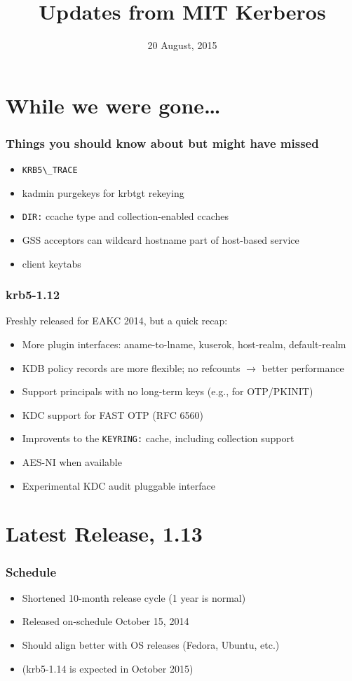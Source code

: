 \documentclass{beamer}
\title{Updates from MIT Kerberos}
\date{20 August, 2015}
\begin{document}
\AtBeginSection[]
{
    \begin{frame}
	\tableofcontents[currentsection]
    \end{frame}
}

\frame{\titlepage}

\section{While we were gone\ldots{}}

\begin{frame}[fragile]
\frametitle{Things you should know about but might have missed}
\begin{itemize}
\item{\verb+KRB5\_TRACE+}
\item{kadmin purgekeys for krbtgt rekeying}
\item{\verb+DIR:+ ccache type and collection-enabled ccaches}
\item{GSS acceptors can wildcard hostname part of host-based service}
\item{client keytabs}
\end{itemize}
\end{frame}

\begin{frame}[fragile]
\frametitle{krb5-1.12}
Freshly released for EAKC 2014, but a quick recap:
\begin{itemize}
\item{More plugin interfaces: aname-to-lname, kuserok, host-realm,
	default-realm}
\item{KDB policy records are more flexible; no refcounts $\rightarrow$
	better performance}
\item{Support principals with no long-term keys (e.g., for OTP/PKINIT)}
\item{KDC support for FAST OTP (RFC 6560)}
\item{Improvents to the \verb+KEYRING:+ cache, including collection support}
\item{AES-NI when available}
\item{Experimental KDC audit pluggable interface}
\end{itemize}
\end{frame}

\section{Latest Release, 1.13}

\begin{frame}
\frametitle{Schedule}
\begin{itemize}
\item{Shortened 10-month release cycle (1 year is normal)}
\item{Released on-schedule October 15, 2014}
\item{Should align better with OS releases (Fedora, Ubuntu, etc.)}
\item{(krb5-1.14 is expected in October 2015)}
\end{itemize}
\end{frame}
\end{document}
